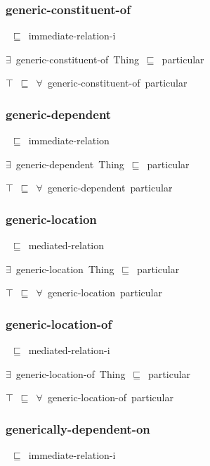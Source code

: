 \documentclass{article}
\begin{document}
\subsubsection*{generic-constituent-of}

~\ensuremath{\sqsubseteq}~immediate-relation-i

\ensuremath{\exists}~generic-constituent-of~Thing~\ensuremath{\sqsubseteq}~particular

\ensuremath{\top}~\ensuremath{\sqsubseteq}~\ensuremath{\forall}~generic-constituent-of~particular

\subsubsection*{generic-dependent}

~\ensuremath{\sqsubseteq}~immediate-relation

\ensuremath{\exists}~generic-dependent~Thing~\ensuremath{\sqsubseteq}~particular

\ensuremath{\top}~\ensuremath{\sqsubseteq}~\ensuremath{\forall}~generic-dependent~particular

\subsubsection*{generic-location}

~\ensuremath{\sqsubseteq}~mediated-relation

\ensuremath{\exists}~generic-location~Thing~\ensuremath{\sqsubseteq}~particular

\ensuremath{\top}~\ensuremath{\sqsubseteq}~\ensuremath{\forall}~generic-location~particular

\subsubsection*{generic-location-of}

~\ensuremath{\sqsubseteq}~mediated-relation-i

\ensuremath{\exists}~generic-location-of~Thing~\ensuremath{\sqsubseteq}~particular

\ensuremath{\top}~\ensuremath{\sqsubseteq}~\ensuremath{\forall}~generic-location-of~particular

\subsubsection*{generically-dependent-on}

~\ensuremath{\sqsubseteq}~immediate-relation-i
\end{document}
